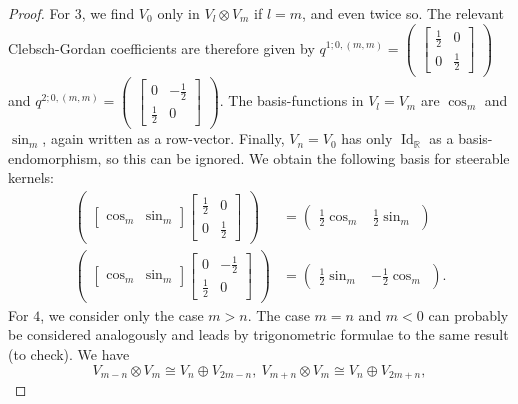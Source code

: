 \documentclass[12pt, a4paper]{article}
\theoremstyle{plain}
\theoremstyle{definition}
\theoremstyle{remark}
\newcommand{\R}{\mathds{R}}
\DeclareMathOperator{\Id}{Id}
\begin{document}
\begin{proof}
For $3$, we find $V_0$ only in $V_l \otimes V_m$ if $l = m$, and even twice so. The relevant Clebsch-Gordan coefficients are therefore given by $q^{1; 0,(m,m)} = \begin{pmatrix} \begin{bmatrix} \frac{1}{2} & 0 \\ 0 & \frac{1}{2} \end{bmatrix}\end{pmatrix}$ and $q^{2;0,(m,m)} = \begin{pmatrix} \begin{bmatrix} 0 & - \frac{1}{2} \\ \frac{1}{2} & 0 \end{bmatrix}\end{pmatrix}$. The basis-functions in $V_l = V_m$ are $\cos_m$ and $\sin_m$, again written as a row-vector. Finally, $V_n = V_0$ has only $\Id_\R$ as a basis-endomorphism, so this can be ignored. We obtain the following basis for steerable kernels:
\begin{align*}
\begin{pmatrix} \begin{bmatrix} \cos_m & \sin_m \end{bmatrix} \begin{bmatrix} \frac{1}{2} & 0 \\ 0 & \frac{1}{2} \end{bmatrix} \end{pmatrix} & = \begin{pmatrix}  \frac{1}{2} \cos_m & \frac{1}{2} \sin_m \end{pmatrix} \\
\begin{pmatrix} \begin{bmatrix} \cos_m & \sin_m \end{bmatrix} \begin{bmatrix} 0 & - \frac{1}{2} \\ \frac{1}{2} & 0 \end{bmatrix} \end{pmatrix} & = \begin{pmatrix}  \frac{1}{2} \sin_m & -\frac{1}{2} \cos_m \end{pmatrix}.
\end{align*}
For $4$, we consider only the case $m > n$. The case $m = n$ and $m < 0$ can probably be considered analogously and leads by trigonometric formulae to the same result (to check). We have
\begin{equation*}
V_{m-n} \otimes V_m \cong V_n \oplus V_{2m-n}, \ V_{m+n} \otimes V_m \cong V_n \oplus V_{2m+n},

\end{equation*}
\end{proof}
\end{document}
